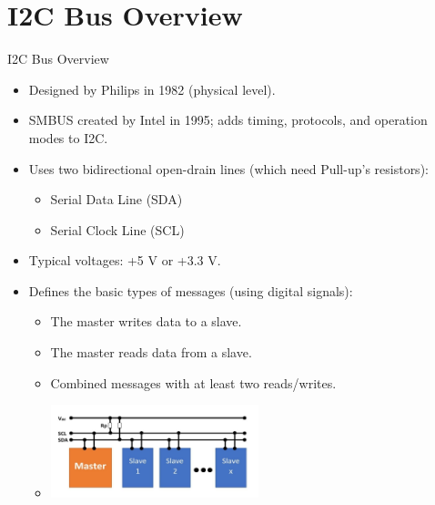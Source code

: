 
\section{I2C Bus Overview}
\begin{frame}{I2C Bus Overview}
    \begin{itemize}
        \item Designed by Philips in 1982 (physical level).
        \item SMBUS created by Intel in 1995; adds timing, protocols, and operation modes to I2C.
        \item Uses two bidirectional open-drain lines (which need Pull-up's resistors):
        \begin{itemize}
            \item Serial Data Line (SDA)
            \item Serial Clock Line (SCL)
        \end{itemize}
        \item Typical voltages: +5 V or +3.3 V.
        \item Defines the basic types of messages (using digital signals): \begin{itemize}
            \item The master writes data to a slave.
            \item The master reads data from a slave.
            \item Combined messages with at least two reads/writes.
            \item[\hspace{1em}] \includegraphics[width=0.5\textwidth]{trainingmaterials/i2c/i2cbasic.jpg}
        \end{itemize}
    \end{itemize}
\end{frame}

